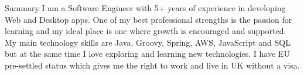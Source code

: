 \documentclass[]{mcdowellcv}
\begin{document}
   \makeheader

  \begin{cvsection}{Summary}
	    \hspace{\parindent} \hspace{\parindent} \hspace{\parindent} \hspace{\parindent} 
		I am a Software Engineer with 5+ years of experience in developing Web and Desktop apps. 
		One of my best professional strengths is the passion for learning and my ideal place is one where growth is encouraged and supported.
		My main technology skills are Java, Groovy, Spring, AWS, JavaScript and SQL but at the same time I love exploring and learning new technologies.
		I have EU pre-settled status which gives me the right to work and live in UK without a visa.
  \end{cvsection}
\end{document}
